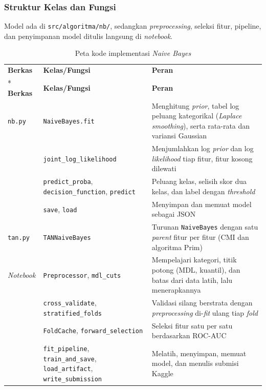 \subsubsection{Struktur Kelas dan Fungsi}
Model ada di \texttt{src/algoritma/nb/}, sedangkan \textit{preprocessing}, seleksi fitur, pipeline, dan penyimpanan model ditulis langsung di \textit{notebook}.

\begin{longtable}{@{}p{2.9cm} p{4.3cm} p{6.6cm}@{}}
	\caption{Peta kode implementasi \textit{Naive Bayes}}
	\label{tab:nb-fungsi}\\
	\toprule
	\textbf{Berkas} & \textbf{Kelas/Fungsi} & \textbf{Peran} \\*
	\midrule
	\endfirsthead
	\toprule
	\textbf{Berkas} & \textbf{Kelas/Fungsi} & \textbf{Peran} \\
	\midrule
	\endhead
	\bottomrule
	\endlastfoot
	\texttt{nb.py} & \texttt{NaiveBayes.fit} & Menghitung \textit{prior}, tabel log peluang kategorikal (\textit{Laplace smoothing}), serta rata-rata dan variansi Gaussian \\
	& \texttt{joint\_\allowbreak log\_\allowbreak likelihood} & Menjumlahkan log \textit{prior} dan log \textit{likelihood} tiap fitur, fitur kosong dilewati \\
	& \texttt{predict\_\allowbreak proba}, \texttt{decision\_\allowbreak function}, \texttt{predict} & Peluang kelas, selisih skor dua kelas, dan label dengan \textit{threshold} \\
	& \texttt{save}, \texttt{load} & Menyimpan dan memuat model sebagai JSON \\
	\midrule
	\texttt{tan.py} & \texttt{TANNaiveBayes} & Turunan \texttt{NaiveBayes} dengan satu \textit{parent} fitur per fitur (CMI dan algoritma Prim) \\
	\midrule
	\textit{Notebook} & \texttt{Preprocessor}, \texttt{mdl\_\allowbreak cuts} & Mempelajari kategori, titik potong (MDL, kuantil), dan batas dari data latih, lalu menerapkannya \\
	& \texttt{cross\_\allowbreak validate}, \texttt{stratified\_\allowbreak folds} & Validasi silang berstrata dengan \textit{preprocessing} di-\textit{fit} ulang tiap \textit{fold} \\
	& \texttt{FoldCache}, \texttt{forward\_\allowbreak selection} & Seleksi fitur satu per satu berdasarkan ROC-AUC \\
	& \texttt{fit\_\allowbreak pipeline}, \texttt{train\_\allowbreak and\_\allowbreak save}, \texttt{load\_\allowbreak artifact}, \texttt{write\_\allowbreak submission} & Melatih, menyimpan, memuat model, dan menulis submisi Kaggle \\
\end{longtable}

